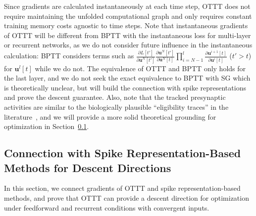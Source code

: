 \documentclass{article}
\begin{document}
Since gradients are calculated instantaneously at each time step, OTTT does not require maintaining the unfolded computational graph and only requires constant training memory costs agnostic to time steps. Note that instantaneous gradients of OTTT will be different from BPTT with the instantaneous loss for multi-layer or recurrent networks, as we do not consider future influence in the instantaneous calculation: BPTT considers terms such as $\frac{\partial L[t']}{\partial \mathbf{u}^N[t']}\frac{\partial \mathbf{u}^N[t']}{\partial \mathbf{u}^N[t]}\prod_{i=N-1}^l\frac{\partial \mathbf{u}^{i+1}[t]}{\partial \mathbf{u}^i[t]}$ ($t'>t$) for $\mathbf{u}^l[t]$ while we do not. The equivalence of OTTT and BPTT only holds for the last layer, and we do not seek the exact equivalence to BPTT with SG which is theoretically unclear, but will build the connection with spike representations and prove the descent guarantee. Also, note that the tracked presynaptic activities are similar to the biologically plausible ``eligibility traces'' in the literature~\cite{zenke2018superspike, bellec2020solution,murray2019local}, and we will provide a more solid theoretical grounding for optimization in Section~\ref{connection spike representation}.

\subsection{Connection with Spike Representation-Based Methods for Descent Directions}\label{connection spike representation}
\vspace{-2mm}

In this section, we connect gradients of OTTT and spike representation-based methods, and prove that OTTT can provide a descent direction for optimization under feedforward and recurrent conditions with convergent inputs. 
\end{document}
